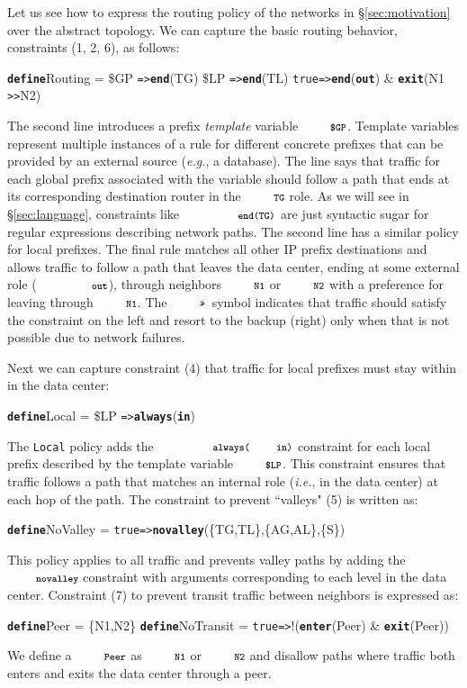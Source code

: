 \documentclass[numbers, 10pt, preprint]{sigplanconf}
\newcommand{\EG}{\emph{e.g.}}
\newcommand{\IE}{\emph{i.e.}}
\newcommand{\CD}[1]{\texttt{\small #1}}
\newcommand{\KW}[1]{\texttt{\small\bfseries{#1}}}
\newcommand{\True}{\CD{true}}
\newcommand{\Define}{\KW{define}}
\newcommand{\Prefer}{\texttt{>>}}
\newcommand{\Path}{\texttt{=>}}
\newcommand{\In}{\KW{in}}
\newcommand{\Out}{\KW{out}}
\newcommand{\Exit}{\KW{exit}}
\newcommand{\End}{\KW{end}}
\newcommand{\Enter}{\KW{enter}}
\newcommand{\Always}{\KW{always}}
\newcommand{\Novalley}{\KW{novalley}}
\begin{document}
Let us see how to express the routing policy of the networks in \S\ref{sec:motivation} over the abstract topology. We can capture the basic routing behavior, constraints (1, 2, 6),  as follows:
%
\begin{code}
\Define Routing =
    \$GP  \Path \End(TG)
    \$LP  \Path \End(TL)
    \True \Path \End(\Out) & \Exit(N1 \Prefer N2)
\end{code}
\noindent%

The second line introduces a prefix \emph{template} variable $\CD{\$GP}$. Template variables represent multiple instances of a rule for different concrete prefixes that can be provided by an external source (\EG, a database). The line says that traffic for each global prefix associated with the variable should follow a path that ends at its corresponding destination router in the $\CD{TG}$ role. As we will see in \S\ref{sec:language}, constraints like $\CD{\End(TG)}$ are just syntactic sugar for regular expressions describing network paths. The second line has a similar policy for local prefixes.
%
The final rule matches all other IP prefix destinations and allows traffic to follow a path that leaves the data center, ending at some external role ($\CD{\Out}$), through neighbors $\CD{N1}$ or $\CD{N2}$ with a preference for leaving through $\CD{N1}$. The $\CD{\Prefer}$~symbol indicates that traffic should satisfy the constraint on the left and resort to the backup (right) only when that is not possible due to network failures.%

Next we can capture constraint (4) that traffic for local prefixes must stay within in the data center:
%
\begin{code}
\Define Local =
    \$LP \Path \Always(\In)
\end{code}
\noindent%
%
The \CD{Local} policy adds the $\CD{\Always(\In)}$ constraint for each local prefix described by the template variable $\CD{\$LP}$. This constraint ensures that traffic follows a path that matches an internal role (\IE, in the data center) at each hop of the path.
%
The constraint to prevent ``valleys" (5) is written as:
%
\begin{code}
\Define NoValley =
    \True \Path \Novalley(\{TG,TL\},\{AG,AL\},\{S\})
\end{code}
\noindent%
%
This policy applies to all traffic and prevents valley paths by adding the $\Novalley$ constraint with arguments corresponding to each level in the data center.
%
Constraint (7) to prevent transit traffic between neighbors is expressed as:
%
\begin{code}
\Define Peer = \{N1,N2\}
\Define NoTransit =
    \True \Path !(\Enter(Peer) & \Exit(Peer))
\end{code}
\noindent%
%
We define a $\CD{Peer}$ as $\CD{N1}$ or $\CD{N2}$ and disallow paths where traffic both enters and exits the data center through a peer.
\end{document}
